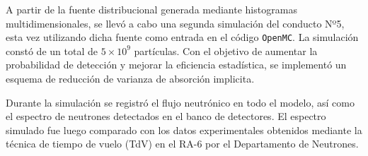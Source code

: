 
A partir de la fuente distribucional generada mediante histogramas multidimensionales, se llevó a cabo una segunda simulación del conducto Nº5, esta vez utilizando dicha fuente como entrada en el código \texttt{OpenMC}. La simulación constó de un total de $5 \times 10^9$ partículas. Con el objetivo de aumentar la probabilidad de detección y mejorar la eficiencia estadística, se implementó un esquema de reducción de varianza de absorción implicita.

Durante la simulación se registró el flujo neutrónico en todo el modelo, así como el espectro de neutrones detectados en el banco de detectores. El espectro simulado fue luego comparado con los datos experimentales obtenidos mediante la técnica de tiempo de vuelo (TdV) en el RA-6 por el Departamento de Neutrones.

